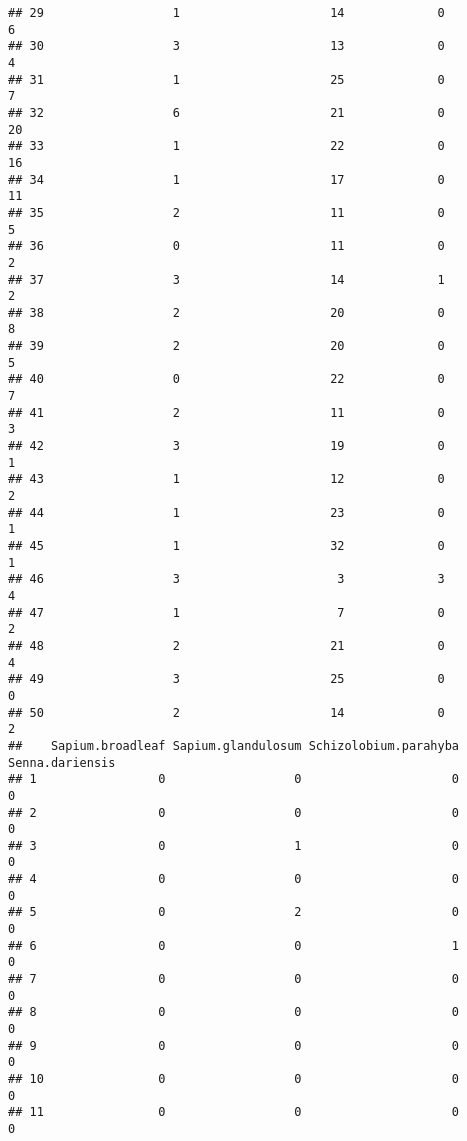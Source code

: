\documentclass[
]{article}
\begin{document}
\begin{verbatim}
## 29                  1                     14             0             6
## 30                  3                     13             0             4
## 31                  1                     25             0             7
## 32                  6                     21             0            20
## 33                  1                     22             0            16
## 34                  1                     17             0            11
## 35                  2                     11             0             5
## 36                  0                     11             0             2
## 37                  3                     14             1             2
## 38                  2                     20             0             8
## 39                  2                     20             0             5
## 40                  0                     22             0             7
## 41                  2                     11             0             3
## 42                  3                     19             0             1
## 43                  1                     12             0             2
## 44                  1                     23             0             1
## 45                  1                     32             0             1
## 46                  3                      3             3             4
## 47                  1                      7             0             2
## 48                  2                     21             0             4
## 49                  3                     25             0             0
## 50                  2                     14             0             2
##    Sapium.broadleaf Sapium.glandulosum Schizolobium.parahyba Senna.dariensis
## 1                 0                  0                     0               0
## 2                 0                  0                     0               0
## 3                 0                  1                     0               0
## 4                 0                  0                     0               0
## 5                 0                  2                     0               0
## 6                 0                  0                     1               0
## 7                 0                  0                     0               0
## 8                 0                  0                     0               0
## 9                 0                  0                     0               0
## 10                0                  0                     0               0
## 11                0                  0                     0               0

\end{verbatim}
\end{document}
